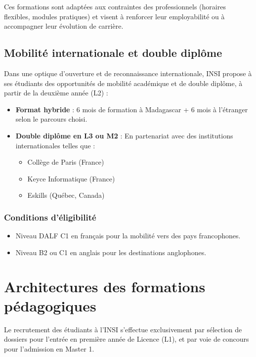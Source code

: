 \documentclass[a4paper,12pt]{book}
\begin{document}
Ces formations sont adaptées aux contraintes des professionnels (horaires flexibles, modules pratiques) et visent à renforcer leur employabilité ou à accompagner leur évolution de carrière.

\subsection{Mobilité internationale et double diplôme}

Dans une optique d’ouverture et de reconnaissance internationale, INSI propose à ses étudiants des opportunités de mobilité académique et de double diplôme, à partir de la deuxième année (L2) :

\begin{itemize}
    \item \textbf{Format hybride} : 6 mois de formation à Madagascar + 6 mois à l’étranger selon le parcours choisi.
    \item \textbf{Double diplôme en L3 ou M2} : En partenariat avec des institutions internationales telles que :
    \begin{itemize}
        \item Collège de Paris (France)
        \item Keyce Informatique (France)
        \item Eskills (Québec, Canada)
    \end{itemize}
\end{itemize}

\subsubsection*{Conditions d’éligibilité}
\begin{itemize}
    \item Niveau DALF C1 en français pour la mobilité vers des pays francophones.
    \item Niveau B2 ou C1 en anglais pour les destinations anglophones.
\end{itemize}

\section{Architectures des formations pédagogiques}

Le recrutement des étudiants à l’INSI s’effectue exclusivement par sélection de dossiers pour l’entrée en première année de Licence (L1), et par voie de concours pour l’admission en Master 1.
\end{document}
